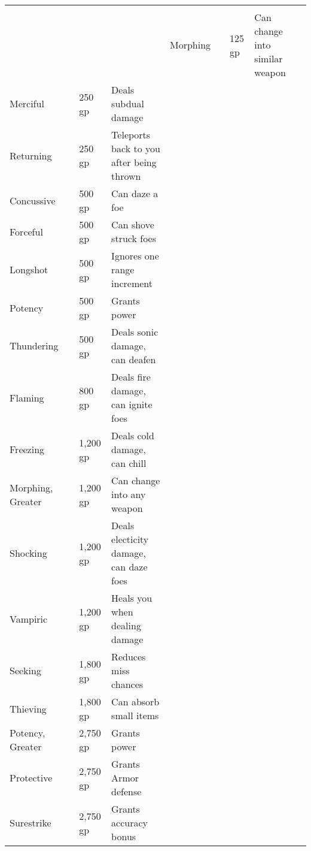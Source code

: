 
\begin{longtabuwrapper}
\begin{longtabu}{l l l X l}
 \\
 &  &  &  &  \tableheaderrule
Morphing &  & 125 gp & Can change into similar weapon & \pageref{item:Morphing} \\
Merciful &  & 250 gp & Deals subdual damage & \pageref{item:Merciful} \\
Returning &  & 250 gp & Teleports back to you after being thrown & \pageref{item:Returning} \\
Concussive &  & 500 gp & Can daze a foe & \pageref{item:Concussive} \\
Forceful &  & 500 gp & Can shove struck foes & \pageref{item:Forceful} \\
Longshot &  & 500 gp & Ignores one range increment & \pageref{item:Longshot} \\
Potency &  & 500 gp & Grants  power & \pageref{item:Potency} \\
Thundering &  & 500 gp & Deals sonic damage, can deafen & \pageref{item:Thundering} \\
Flaming &  & 800 gp & Deals fire damage, can ignite foes & \pageref{item:Flaming} \\
Freezing &  & 1,200 gp & Deals cold damage, can chill & \pageref{item:Freezing} \\
Morphing, Greater &  & 1,200 gp & Can change into any weapon & \pageref{item:Morphing, Greater} \\
Shocking &  & 1,200 gp & Deals electicity damage, can daze foes & \pageref{item:Shocking} \\
Vampiric &  & 1,200 gp & Heals you when dealing damage & \pageref{item:Vampiric} \\
Seeking &  & 1,800 gp & Reduces miss chances & \pageref{item:Seeking} \\
Thieving &  & 1,800 gp & Can absorb small items & \pageref{item:Thieving} \\
Potency, Greater &  & 2,750 gp & Grants  power & \pageref{item:Potency, Greater} \\
Protective &  & 2,750 gp & Grants  Armor defense & \pageref{item:Protective} \\
Surestrike &  & 2,750 gp & Grants  accuracy bonus & \pageref{item:Surestrike} \\

\end{longtabu}
\end{longtabuwrapper}
